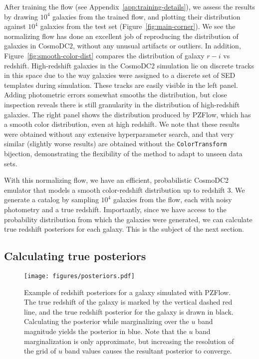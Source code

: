\documentclass[twocolumn,twocolappendix]{aastex631}
\begin{document}
After training the flow (see Appendix~\ref{app:training-details}), we assess the results by drawing $10^4$ galaxies from the trained flow, and plotting their distribution against  $10^4$ galaxies from the test set (Figure~\ref{fig:main-corner}).
We see the normalizing flow has done an excellent job of reproducing the distribution of galaxies in CosmoDC2, without any unusual artifacts or outliers.
In addition, Figure~\ref{fig:smooth-color-dist} compares the distribution of galaxy $r-i$ vs redshift.
High-redshift galaxies in the CosmoDC2 simulation lie on discrete tracks in this space due to the way galaxies were assigned to a discrete set of SED templates during simulation.
These tracks are easily visible in the left panel.
Adding photometric errors somewhat smooths the distribution, but close inspection reveals there is still granularity in the distribution of high-redshift galaxies.
The right panel shows the distribution produced by PZFlow, which has a smooth color distribution, even at high redshift.
We note that these results were obtained without any extensive hyperparameter search, and that very similar (slightly worse results) are obtained without the \texttt{ColorTransform} bijection, demonstrating the flexibility of the method to adapt to unseen data sets.

With this normalizing flow, we have an efficient, probabilistic CosmoDC2 emulator that models a smooth color-redshift distribution up to redshift 3.
We generate a catalog by sampling $10^4$ galaxies from the flow, each with noisy photometry and a true redshift.
Importantly, since we have access to the probability distribution from which the galaxies were generated, we can calculate true redshift posteriors for each galaxy.
This is the subject of the next section.

\subsection{Calculating true posteriors}
\label{sec:true-posteriors}

\begin{figure}[t]
    \begin{centering}
        \texttt{[image: figures/posteriors.pdf]}
        \caption{
            Example of redshift posteriors for a galaxy simulated with PZFlow.
            The true redshift of the galaxy is marked by the vertical dashed red line, and the true redshift posterior for the galaxy is drawn in black.
            Calculating the posterior while marginalizing over the $u$ band magnitude yields the posterior in blue.
            Note that the $u$ band marginalization is only approximate, but increasing the resolution of the grid of $u$ band values causes the resultant posterior to converge.
        }
        \label{fig:posteriors}
    \end{centering}
\end{figure}
\end{document}
